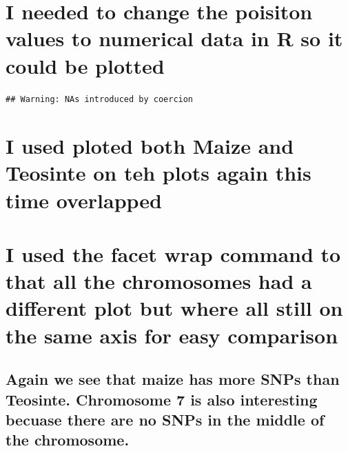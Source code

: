 \documentclass[
]{article}
\newenvironment{Shaded}{\begin{snugshade}}{\end{snugshade}}
\newcommand{\FunctionTok}[1]{\textcolor[rgb]{0.13,0.29,0.53}{\textbf{#1}}}
\newcommand{\NormalTok}[1]{#1}
\newcommand{\OtherTok}[1]{\textcolor[rgb]{0.56,0.35,0.01}{#1}}
\newcommand{\SpecialCharTok}[1]{\textcolor[rgb]{0.81,0.36,0.00}{\textbf{#1}}}
\begin{document}
\section{I needed to change the poisiton values to numerical data in R
so it could be
plotted}\label{i-needed-to-change-the-poisiton-values-to-numerical-data-in-r-so-it-could-be-plotted}

\begin{Shaded}
\end{Shaded}

\begin{verbatim}
## Warning: NAs introduced by coercion
\end{verbatim}

\section{I used ploted both Maize and Teosinte on teh plots again this
time
overlapped}\label{i-used-ploted-both-maize-and-teosinte-on-teh-plots-again-this-time-overlapped}

\section{I used the facet wrap command to that all the chromosomes had a
different plot but where all still on the same axis for easy
comparison}\label{i-used-the-facet-wrap-command-to-that-all-the-chromosomes-had-a-different-plot-but-where-all-still-on-the-same-axis-for-easy-comparison}

\subsection{Again we see that maize has more SNPs than Teosinte.
Chromosome 7 is also interesting becuase there are no SNPs in the middle
of the
chromosome.}\label{again-we-see-that-maize-has-more-snps-than-teosinte.-chromosome-7-is-also-interesting-becuase-there-are-no-snps-in-the-middle-of-the-chromosome.}
\end{document}
